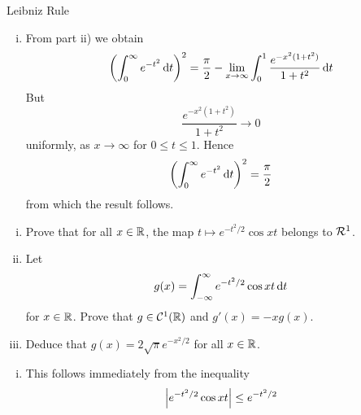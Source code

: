 \begin{section}{Leibniz Rule}
\begin{soln}
\begin{enumerate}[i)]
		\item
			From part ii) we obtain
				\begin{displaymath}
					\left(\myinta{0}{\infty}{e^{-t^2}}{t}\right)^2
						= \frac{\pi}{2} - \lim_{x \rightarrow \infty}
						\myinta{0}{1}{\frac{e^{-x^2(1+t^2)}}{1+t^2}}{t}
				\end{displaymath}
			But
				\begin{displaymath}
					\frac{e^{-x^2(1+t^2)}}{1+t^2} \rightarrow 0
				\end{displaymath}
			uniformly, as $x \rightarrow \infty$ for $0 \leq t \leq 1$.
			Hence
				\begin{displaymath}
					\left(\myinta{0}{\infty}{e^{-t^2}}{t}\right)^2
						= \frac{\pi}{2}
				\end{displaymath}
			from which the result follows.
	
	\end{enumerate}
\end{soln}


\begin{ex}
	\begin{enumerate}[i)]
		\item
			Prove that for all $\isreal$, the map $t \mapsto
			e^{-t^2/2} \cos xt$ belongs to $\absint$.
		\item
			Let
				\begin{displaymath}
					g(x) = \myintb{e^{-t^2/2}\cos xt}{t}
				\end{displaymath}
			for $\isreal$. Prove that $g \in \ctsdiff[1](\real)$
			and $g'(x) = -x g(x)$.
		\item
			Deduce that $g(x) = 2\sqrt{\pi} e^{-x^2/2}$ for all $\isreal$.
	\end{enumerate}
\end{ex}

\begin{soln}
	\begin{enumerate}[i)]
	
		\item
			This follows immediately from the inequality
				\begin{displaymath}
					\modulus{e^{-t^2/2} \cos xt} \leq e^{-t^2/2}
				\end{displaymath}
			

\end{enumerate}
\end{soln}
\end{section}
